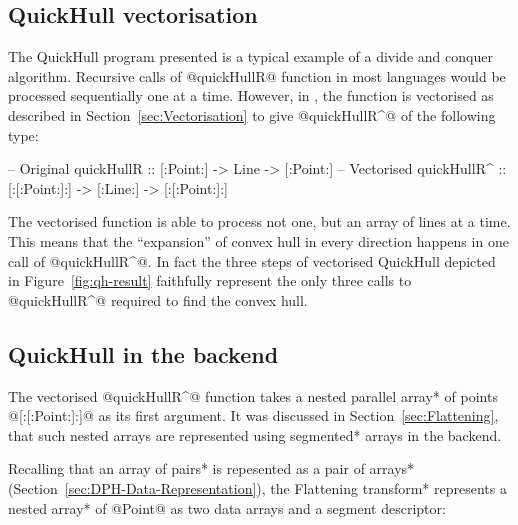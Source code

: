 \documentclass[preamble.tex]{subfiles}
\begin{document}
\subsection{QuickHull vectorisation}

The QuickHull program presented is a typical example of a divide and conquer algorithm. Recursive calls of @quickHullR@ function in most languages would be processed sequentially one at a time. However, in \DPH, the function is vectorised as described in Section~\ref{sec:Vectorisation} to give @quickHullR^@ of the following type:


\begin{hscode}[literate={^}{{$^\uparrow$}}1,]
-- Original
quickHullR  :: [:Point:] -> Line -> [:Point:]
-- Vectorised
quickHullR^ :: [:[:Point:]:] -> [:Line:] -> [:[:Point:]:]
\end{hscode}


The vectorised function is able to process not one, but an array of lines at a time. This means that the ``expansion'' of convex hull in every direction happens in one call of @quickHullR^@. In fact the three steps of vectorised QuickHull depicted in Figure~\ref{fig:qh-result} faithfully represent the only three calls to @quickHullR^@ required to find the convex hull.



\subsection{QuickHull in the backend}

The vectorised @quickHullR^@ function takes a \*nested parallel array* of points @[:[:Point:]:]@ as its first argument. It was discussed in Section~\ref{sec:Flattening}, that such nested arrays are represented using \*segmented* arrays in the backend.

Recalling that an \*array of pairs* is repesented as a \*pair of arrays* (Section~\ref{sec:DPH-Data-Representation}), the \*Flattening transform* represents a \*nested array* of @Point@ as two data arrays and a segment descriptor:


\newlength\fixedcharwidth
{}
\newcommand\seg[1]{\rule{#1\fixedcharwidth}{1pt}}

\end{document}
